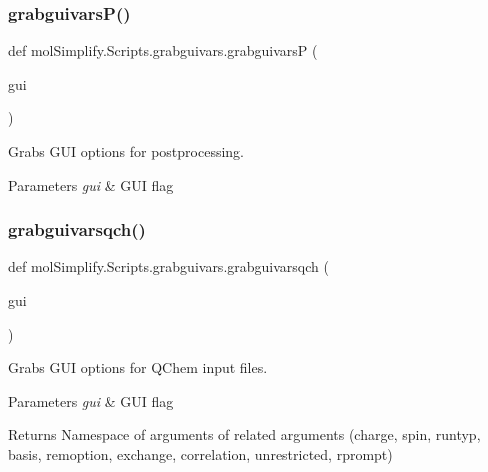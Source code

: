 \subsubsection{\texorpdfstring{grabguivars\+P()}{grabguivarsP()}}
{\footnotesize\ttfamily def mol\+Simplify.\+Scripts.\+grabguivars.\+grabguivarsP (\begin{DoxyParamCaption}\item[{}]{gui }\end{DoxyParamCaption})}



Grabs G\+UI options for postprocessing. 


\begin{DoxyParams}{Parameters}
{\em gui} & G\+UI flag \\
\hline
\end{DoxyParams}
\mbox{\label{namespacemolSimplify_1_1Scripts_1_1grabguivars_afd2a87d614162a4c7f3fe0abc32a8bde}} 
\subsubsection{\texorpdfstring{grabguivarsqch()}{grabguivarsqch()}}
{\footnotesize\ttfamily def mol\+Simplify.\+Scripts.\+grabguivars.\+grabguivarsqch (\begin{DoxyParamCaption}\item[{}]{gui }\end{DoxyParamCaption})}



Grabs G\+UI options for Q\+Chem input files. 


\begin{DoxyParams}{Parameters}
{\em gui} & G\+UI flag \\
\hline
\end{DoxyParams}
\begin{DoxyReturn}{Returns}
Namespace of arguments of related arguments (charge, spin, runtyp, basis, remoption, exchange, correlation, unrestricted, rprompt) 
\end{DoxyReturn}
\mbox{\label{namespacemolSimplify_1_1Scripts_1_1grabguivars_a5a9325c49daea993b7abe3e5f2ea828e}} 
